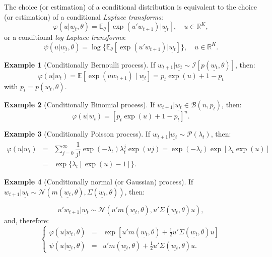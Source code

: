 \documentclass[
  12pt,
]{book}
\theoremstyle{definition}
\theoremstyle{definition}
\newtheorem{example}{Example}[chapter]
\theoremstyle{definition}
\theoremstyle{definition}
\theoremstyle{remark}
\begin{document}
The choice (or estimation) of a conditional distribution is equivalent to the choice (or estimation) of a conditional \emph{Laplace transforms}:
\begin{equation}
\varphi(u|\underline{w_t},\theta) =
\mathbb{E}_{\theta}[\exp(u'w_{t+1})|\underline{w_t}], \quad u \in \mathbb{R}^K,\label{eq:LT}
\end{equation}
or a conditional \emph{log Laplace transforms}:
\[
\psi(u|\underline{w_t},\theta) =
\log\{\mathbb{E}_{\theta}[\exp(u'w_{t+1})|\underline{w_t}]\}, \quad u \in
\mathbb{R}^K.
\]

\begin{example}[Conditionally Bernoulli process]
\protect\hypertarget{exm:exBenoulli}{}\label{exm:exBenoulli}If \(w_{t+1}|\underline{w_t} \sim {\mathcal{I}} [p(\underline{w_t},\theta)]\), then:
\[
\varphi(u|w_t)=
\mathbb{E}[\exp(u w_{t+1}) \mid \underline{w_t}] = p_t \exp(u) + 1-p_t
\]
with \(p_t = p(\underline{w_t}, \theta)\).
\end{example}

\begin{example}[Conditionally Binomial process]
\protect\hypertarget{exm:exBenoulli2}{}\label{exm:exBenoulli2}If \(w_{t+1}|\underline{w_t} \in {\mathcal{B}}(n, p_t)\), then:
\[
\varphi(u|w_t)=[p_t   \exp(u) + 1-p_t]^n.
\]
\end{example}

\begin{example}[Conditionally Poisson process]
\protect\hypertarget{exm:exPoisson}{}\label{exm:exPoisson}If \(w_{t+1}|\underline{w_t} \sim {\mathcal{P}}(\lambda_t)\), then:
\begin{eqnarray*}
\varphi(u|w_t) & =&   \sum^\infty_{j=0}  \dfrac{1}{j!}  \exp(-\lambda_t) \lambda^j_t   \exp(uj)  = \exp(-\lambda_t) \exp[\lambda_t \exp(u)] \\
& =& \exp\{\lambda_t[\exp(u)-1]\}.
\end{eqnarray*}
\end{example}

\begin{example}[Conditionally normal (or Gaussian) process]
\protect\hypertarget{exm:exGaussian}{}\label{exm:exGaussian}If \(w_{t+1}|\underline{w_t} \sim \mathcal{N}\left(m(\underline{w_t},\theta), \Sigma(\underline{w_t},\theta)\right)\), then:

\[
u'w_{t+1}|\underline{w_t} \sim \mathcal{N}\left(u'm(\underline{w_t},\theta), u'\Sigma(\underline{w_t},\theta)u\right),
\]
and, therefore:
\[
\left\{
\begin{array}{ccc}
\varphi(u|\underline{w_t},\theta) &=& \exp\left[u'm(\underline{w_t},\theta)+
\frac{1}{2} u'\Sigma(\underline{w_t},\theta)u\right]\\
\psi(u|\underline{w_t},\theta) &=&
u'm(\underline{w_t},\theta) +  \frac{1}{2}
u'\Sigma(\underline{w_t},\theta)u.
\end{array}
\right.
\]
\end{example}
\end{document}
